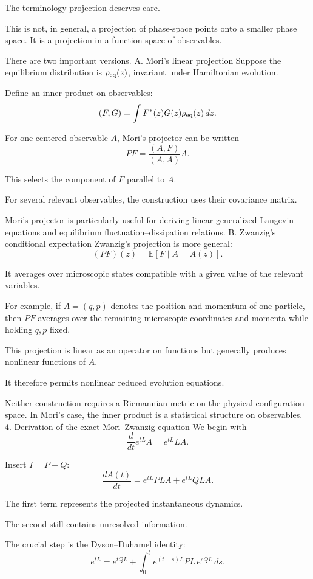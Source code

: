 The terminology projection deserves care.

This is not, in general, a projection of phase-space points onto a smaller phase space. It is a projection in a function space of observables.

There are two important versions.
A. Mori's linear projection
Suppose the equilibrium distribution is \(\rho_{\rm eq}(z)\), invariant under Hamiltonian evolution.

Define an inner product on observables:
\[
(F,G)=\int F^*(z)G(z)\rho_{\rm eq}(z)\,dz.
\]

For one centered observable \(A\), Mori's projector can be written
\[
\boxed{
PF=\frac{(A,F)}{(A,A)}A.
}
\]

This selects the component of \(F\) parallel to \(A\).

For several relevant observables, the construction uses their covariance matrix.

Mori's projector is particularly useful for deriving linear generalized Langevin equations and equilibrium fluctuation–dissipation relations.
B. Zwanzig's conditional expectation
Zwanzig's projection is more general:
\[
\boxed{
(PF)(z)=\mathbb E[F\mid A=A(z)].
}
\]

It averages over microscopic states compatible with a given value of the relevant variables.

For example, if \(A=(q,p)\) denotes the position and momentum of one particle, then \(PF\) averages over the remaining microscopic coordinates and momenta while holding \(q,p\) fixed.

This projection is linear as an operator on functions but generally produces nonlinear functions of \(A\).

It therefore permits nonlinear reduced evolution equations.

Neither construction requires a Riemannian metric on the physical configuration space. In Mori's case, the inner product is a statistical structure on observables.
4. Derivation of the exact Mori–Zwanzig equation
We begin with
\[
\frac{d}{dt}e^{tL}A=e^{tL}LA.
\]

Insert \(I=P+Q\):
\[
\frac{dA(t)}{dt}
=
e^{tL}PLA+e^{tL}QLA.
\]

The first term represents the projected instantaneous dynamics.

The second still contains unresolved information.

The crucial step is the Dyson–Duhamel identity:
\[
\boxed{
e^{tL}
=
e^{tQL}
+
\int_0^t
e^{(t-s)L}PL\,e^{sQL}\,ds.
}
\]

